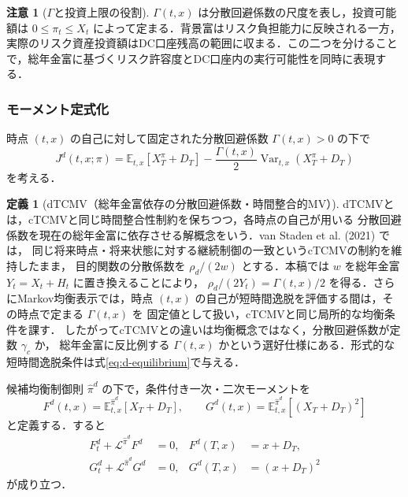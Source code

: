 \documentclass[10pt,a4paper]{article}
\theoremstyle{plain}
\theoremstyle{definition}
\newtheorem{definition}{定義}
\newtheorem{remark}{注意}
\newcommand{\E}{\mathbb{E}}
\DeclareMathOperator{\Var}{Var}
\newcommand{\Lop}{\mathcal{L}}
\begin{document}
\begin{remark}[$\Gamma$と投資上限の役割]
$\Gamma(t,x)$ は分散回避係数の尺度を表し，投資可能額は $0\leq\pi_t\leq X_t$ によって定まる．背景富はリスク負担能力に反映される一方，実際のリスク資産投資額はDC口座残高の範囲に収まる．この二つを分けることで，総年金富に基づくリスク許容度とDC口座内の実行可能性を同時に表現する．
\end{remark}

\subsubsection{モーメント定式化}

時点 $(t,x)$ の自己に対して固定された分散回避係数 $\Gamma(t,x)>0$ の下で
\begin{equation}
  J^d(t,x;\pi)=\E_{t,x}[X_T^\pi+D_T]
  -\frac{\Gamma(t,x)}{2}\Var_{t,x}(X_T^\pi+D_T)
  \label{eq:d-objective}
\end{equation}
を考える．

\begin{definition}[dTCMV（総年金富依存の分散回避係数・時間整合的MV）]
\label{def:dtcmv}
dTCMVとは，cTCMVと同じ時間整合性制約を保ちつつ，各時点の自己が用いる
分散回避係数を現在の総年金富に依存させる解概念をいう．van Staden et al. (2021) では，
同じ将来時点・将来状態に対する継続制御の一致というcTCMVの制約を維持したまま，
目的関数の分散係数を $\rho_d/(2w)$ とする．本稿では $w$ を総年金富
$Y_t=X_t+H_t$ に置き換えることにより，
$\rho_d/(2Y_t)=\Gamma(t,x)/2$ を得る．さらにMarkov均衡表示では，時点
$(t,x)$ の自己が短時間逸脱を評価する間は，その時点で定まる $\Gamma(t,x)$ を
固定値として扱い，cTCMVと同じ局所的な均衡条件を課す．
したがってcTCMVとの違いは均衡概念ではなく，分散回避係数が定数 $\gamma_c$ か，
総年金富に反比例する $\Gamma(t,x)$ かという選好仕様にある．形式的な
短時間逸脱条件は式\eqref{eq:d-equilibrium}で与える．
\end{definition}

候補均衡制御則 $\hat\pi^d$ の下で，条件付き一次・二次モーメントを
\begin{equation}
  F^d(t,x)=\E_{t,x}^{\hat\pi^d}[X_T+D_T],
  \qquad
  G^d(t,x)=\E_{t,x}^{\hat\pi^d}[(X_T+D_T)^2]
  \label{eq:d-FG}
\end{equation}
と定義する．すると
\begin{align}
  F_t^d+\Lop^{\hat\pi^d}F^d&=0,
  &F^d(T,x)&=x+D_T,
  \label{eq:Fd}\\
  G_t^d+\Lop^{\hat\pi^d}G^d&=0,
  &G^d(T,x)&=(x+D_T)^2
  \label{eq:Gd}
\end{align}
が成り立つ．
\end{document}

